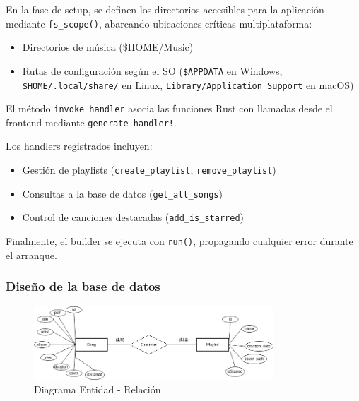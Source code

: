 \documentclass[11pt, a4paper]{article}
\begin{document}
            En la fase de setup, se definen los directorios accesibles para la aplicación mediante \texttt{fs\_scope()}, abarcando ubicaciones críticas multiplataforma:

            \begin{itemize}
                \item Directorios de música (\$HOME/Music)
                \item Rutas de configuración según el SO (\texttt{\$APPDATA} en Windows, \texttt{\$HOME/.local/share/} en Linux, \texttt{Library/Application Support} en macOS)
            \end{itemize}

            El método \texttt{invoke\_handler} asocia las funciones Rust con llamadas desde el frontend mediante \texttt{generate\_handler!}.

            Los handlers registrados incluyen:

            \begin{itemize}
                \item Gestión de playlists (\texttt{create\_playlist}, \texttt{remove\_playlist})
                \item Consultas a la base de datos (\texttt{get\_all\_songs})
                \item Control de canciones destacadas (\texttt{add\_is\_starred})
            \end{itemize}

            Finalmente, el builder se ejecuta con \texttt{run()}, propagando cualquier error durante el arranque.

            \subsubsection{Diseño de la base de datos}

            \begin{figure}[H]
              \centering
              \includegraphics[width=0.8\textwidth]{media/ER.drawio.png}
              \caption{Diagrama Entidad - Relación}
              \label{fig:er}
            \end{figure}
\end{document}
